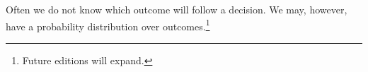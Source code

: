 

Often we do not know which outcome will follow a decision.
We may, however, have a probability distribution over outcomes.\footnote{Future editions will expand.}

\blankpage
